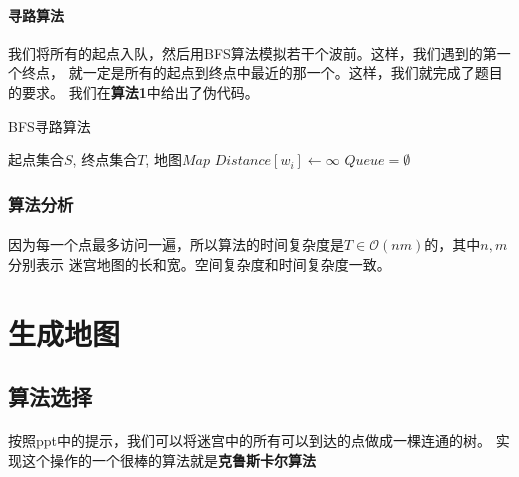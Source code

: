 \documentclass{article}
\begin{document}
			\paragraph{寻路算法}
				我们将所有的起点入队，然后用BFS算法模拟若干个波前。这样，我们遇到的第一个终点，
				就一定是所有的起点到终点中最近的那一个。这样，我们就完成了题目的要求。
				我们在\textbf{算法1}中给出了伪代码。
				\begin{algorithm}[!h]
					\caption{BFS寻路算法}
					\begin{algorithmic}[1]
						 {起点集合$S$, 终点集合$T$, 地图$Map$}
								\State $Distance[w_i] \gets \infty$
							\EndFor
							\State $Queue = \emptyset$
							\EndFor
								\EndIf
									\EndIf
								\EndFor
							\EndWhile
							\State{\Return $\infty$}
						\EndFunction
					\end{algorithmic}
				\end{algorithm}
		\subsubsection{算法分析}
			\paragraph{}
				因为每一个点最多访问一遍，所以算法的时间复杂度是$T \in \mathcal{O}(nm)$的，其中$n, m$分别表示
				迷宫地图的长和宽。空间复杂度和时间复杂度一致。
\section{生成地图}
	\subsection{算法选择}
		\paragraph{}
			按照ppt中的提示，我们可以将迷宫中的所有可以到达的点做成一棵连通的树。
			实现这个操作的一个很棒的算法就是\textbf{克鲁斯卡尔算法}
\end{document}
